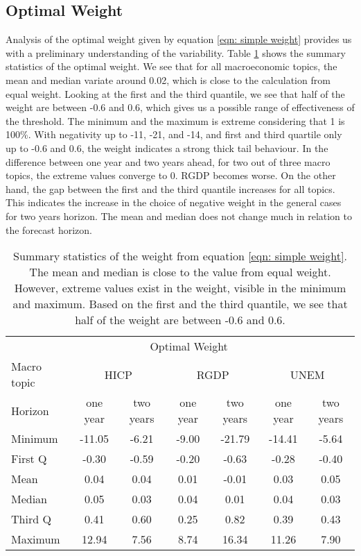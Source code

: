 \documentclass[11pt]{article}
\begin{document}
\subsection{Optimal Weight}\label{optimal-weight}
Analysis of the optimal weight given by equation \ref{eqn: simple weight} provides us with a preliminary understanding of the variability. Table \ref{tab: simple weight summary statistics} shows the summary statistics of the optimal weight. We see that for all macroeconomic topics, the mean and median variate around 0.02, which is close to the calculation from equal weight. Looking at the first and the third quantile, we see that half of the weight are between -0.6 and 0.6, which gives us a possible range of effectiveness of the threshold. The minimum and the maximum is extreme considering that 1 is 100\%. With negativity up to -11, -21, and -14, and first and third quartile only up to -0.6 and 0.6, the weight indicates a strong thick tail behaviour. In the difference between one year and two years ahead, for two out of three macro topics, the extreme values converge to 0. RGDP becomes worse. On the other hand, the gap between the first and the third quantile increases for all topics. This indicates the increase in the choice of negative weight in the general cases for two years horizon. The mean and median does not change much in relation to the forecast horizon.

\begin{table}[!h]
	\centering
	\caption{Summary statistics of the weight from equation \ref{eqn: simple weight}. The mean and median is close to the value from equal weight. However, extreme values exist in the weight, visible in the minimum and maximum. Based on the first and the third quantile, we see that half of the weight are between -0.6 and 0.6.}
	\label{tab: simple weight summary statistics}
	\begin{tabular}{lcccccc}%
		\hline
		&\multicolumn{5}{c}{Optimal Weight}\\
		\cmidrule(lr){2-7}
		Macro topic & \multicolumn{2}{c}{HICP} & \multicolumn{2}{c}{RGDP} & \multicolumn{2}{c}{UNEM} \\
		\cmidrule(lr){2-3} \cmidrule(lr){4-5}\cmidrule(lr){6-7}
		Horizon     & one year & two years & one year & two years & one year & two years \\ 
		\hline
		Minimum      & -11.05      & -6.21      & -9.00      & -21.79      & -14.41      & -5.64      \\
		First Q      & -0.30       & -0.59      & -0.20      & -0.63       & -0.28       & -0.40      \\
		Mean         & 0.04        & 0.04       & 0.01       & -0.01       & 0.03        & 0.05       \\
		Median       & 0.05        & 0.03       & 0.04       & 0.01        & 0.04        & 0.03       \\
		Third Q      & 0.41        & 0.60       & 0.25       & 0.82        & 0.39        & 0.43       \\
		Maximum      & 12.94       & 7.56       & 8.74       & 16.34       & 11.26       & 7.90       \\ 
		\hline
	\end{tabular}
\end{table}
\end{document}
